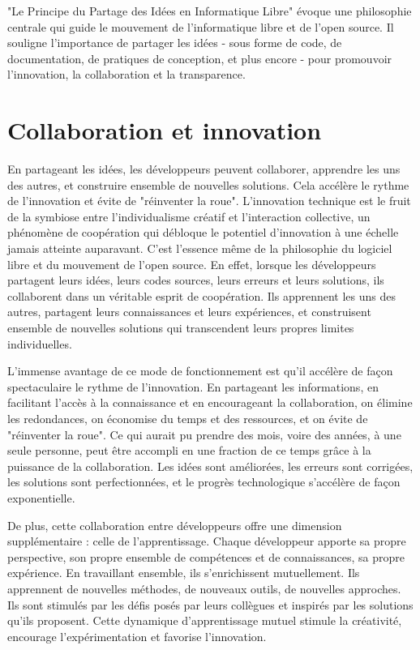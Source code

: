"Le Principe du Partage des Idées en Informatique Libre" évoque une philosophie centrale qui guide le mouvement de l'informatique libre et de l'open source. Il souligne l'importance de partager les idées - sous forme de code, de documentation, de pratiques de conception, et plus encore - pour promouvoir l'innovation, la collaboration et la transparence.\\

\section{Collaboration et innovation} 
En partageant les idées, les développeurs peuvent collaborer, apprendre les uns des autres, et construire ensemble de nouvelles solutions. Cela accélère le rythme de l'innovation et évite de "réinventer la roue".
L'innovation technique est le fruit de la symbiose entre l'individualisme créatif et l'interaction collective, un phénomène de coopération qui débloque le potentiel d'innovation à une échelle jamais atteinte auparavant. C'est l'essence même de la philosophie du logiciel libre et du mouvement de l'open source. En effet, lorsque les développeurs partagent leurs idées, leurs codes sources, leurs erreurs et leurs solutions, ils collaborent dans un véritable esprit de coopération. Ils apprennent les uns des autres, partagent leurs connaissances et leurs expériences, et construisent ensemble de nouvelles solutions qui transcendent leurs propres limites individuelles.

L'immense avantage de ce mode de fonctionnement est qu'il accélère de façon spectaculaire le rythme de l'innovation. En partageant les informations, en facilitant l'accès à la connaissance et en encourageant la collaboration, on élimine les redondances, on économise du temps et des ressources, et on évite de "réinventer la roue". Ce qui aurait pu prendre des mois, voire des années, à une seule personne, peut être accompli en une fraction de ce temps grâce à la puissance de la collaboration. Les idées sont améliorées, les erreurs sont corrigées, les solutions sont perfectionnées, et le progrès technologique s'accélère de façon exponentielle.

De plus, cette collaboration entre développeurs offre une dimension supplémentaire : celle de l'apprentissage. Chaque développeur apporte sa propre perspective, son propre ensemble de compétences et de connaissances, sa propre expérience. En travaillant ensemble, ils s'enrichissent mutuellement. Ils apprennent de nouvelles méthodes, de nouveaux outils, de nouvelles approches. Ils sont stimulés par les défis posés par leurs collègues et inspirés par les solutions qu'ils proposent. Cette dynamique d'apprentissage mutuel stimule la créativité, encourage l'expérimentation et favorise l'innovation.

